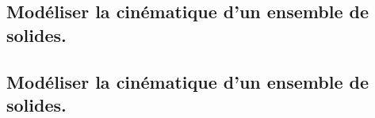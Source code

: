 \documentclass[10pt,fleqn]{book}
\newcommand{\repRel}{../..}
\newcommand{\repStyle}{\repRel/Style}
\newcommand{\td}{fichier_td}
\newcommand{\repExos}{\repRel/ExercicesCompetences}
\newcommand{\repExo}{dossier}
\begin{document}
\renewcommand{\repExo}{\repExos/B2_ProposerModele/B2_12_ModeliserSchemasCinematiques/17_4Barres}
\renewcommand{\td}{17_4Barres}
\graphicspath{{\repStyle/png/}{\repExo/images/}}


\renewcommand{\repExo}{\repExos/B2_ProposerModele/B2_12_ModeliserSchemasCinematiques/18_Maxpid}
\renewcommand{\td}{18_Maxpid}
\graphicspath{{\repStyle/png/}{\repExo/images/}}


\renewcommand{\repExo}{\repExos/B2_ProposerModele/B2_12_ModeliserSchemasCinematiques/46_RR_RSG}
\renewcommand{\td}{46_RR_RSG}
\graphicspath{{\repStyle/png/}{\repExo/images/}}


\renewcommand{\repExo}{\repExos/B2_ProposerModele/B2_12_ModeliserSchemasCinematiques/513_Divers_Tabouret}
\renewcommand{\td}{513_Divers_Tabouret}
\graphicspath{{\repStyle/png/}{\repExo/images/}}


\renewcommand{\repExo}{\repExos/B2_ProposerModele/B2_12_ModeliserSchemasCinematiques/514_Divers_Tabouret}
\renewcommand{\td}{514_Divers_Tabouret}
\graphicspath{{\repStyle/png/}{\repExo/images/}}


\subsection{Modéliser la cinématique d'un ensemble de solides.} 

\subsection{Modéliser la cinématique d'un ensemble de solides.} 

\renewcommand{\repExo}{\repExos/B2_ProposerModele/B2_13_ModeliserCinematique/01_T}
\renewcommand{\td}{01_T}
\graphicspath{{\repStyle/png/}{\repExo/images/}}


\renewcommand{\repExo}{\repExos/B2_ProposerModele/B2_13_ModeliserCinematique/01_T_02}
\renewcommand{\td}{01_T_02}
\graphicspath{{\repStyle/png/}{\repExo/images/}}


\renewcommand{\repExo}{\repExos/B2_ProposerModele/B2_13_ModeliserCinematique/02_R}
\renewcommand{\td}{02_R}
\graphicspath{{\repStyle/png/}{\repExo/images/}}


\renewcommand{\repExo}{\repExos/B2_ProposerModele/B2_13_ModeliserCinematique/02_R_02}
\renewcommand{\td}{02_R_02}
\graphicspath{{\repStyle/png/}{\repExo/images/}}

\end{document}
